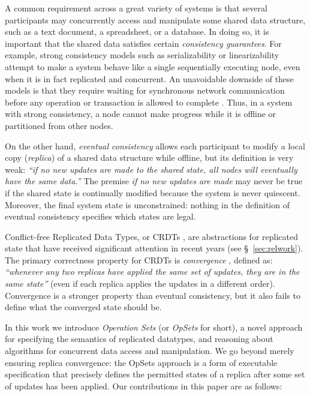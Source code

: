 \documentclass[11pt]{article}
\begin{document}
A common requirement across a great variety of systems is that several participants may concurrently access and manipulate some shared data structure, such as a text document, a spreadsheet, or a database.
In doing so, it is important that the shared data satisfies certain \emph{consistency guarantees}.
For example, strong consistency models such as serializability \cite{Kleppmann:2017wj} or linearizability \cite{Herlihy:1990jq} attempt to make a system behave like a single sequentially executing node, even when it is in fact replicated and concurrent.
An unavoidable downside of these models is that they require waiting for synchronous network communication before any operation or transaction is allowed to complete \cite{Davidson:1985hv,Gilbert:2002il}.
Thus, in a system with strong consistency, a node cannot make progress while it is offline or partitioned from other nodes.

On the other hand, \emph{eventual consistency} \cite{Bailis:2013jc,Burckhardt:2014hy,Terry:1994fp,Vogels:2009ca} allows each participant to modify a local copy (\emph{replica}) of a shared data structure while offline, but its definition is very weak: \emph{``if no new updates are made to the shared state, all nodes will eventually have the same data.''}
The premise \emph{if no new updates are made} may never be true if the shared state is continually modified because the system is never quiescent.
Moreover, the final system state is unconstrained: nothing in the definition of eventual consistency specifies which states are legal.

Conflict-free Replicated Data Types, or CRDTs \cite{Shapiro:2011wy,Shapiro:2011un}, are abstractions for replicated state that have received significant attention in recent years (see \S~\ref{sec:relwork}).
The primary correctness property for CRDTs is \emph{convergence} \cite{Shapiro:2011un,Gomes:2017gy}, defined as: \emph{``whenever any two replicas have applied the same set of updates, they are in the same state''} (even if each replica applies the updates in a different order).
Convergence is a stronger property than eventual consistency, but it also fails to define what the converged state should be.

In this work we introduce \emph{Operation Sets} (or \emph{OpSets} for short), a novel approach for specifying the semantics of replicated datatypes, and reasoning about algorithms for concurrent data access and manipulation.
We go beyond merely ensuring replica convergence: the OpSets approach is a form of executable specification that precisely defines the permitted states of a replica after some set of updates has been applied.
Our contributions in this paper are as follows:
\end{document}
